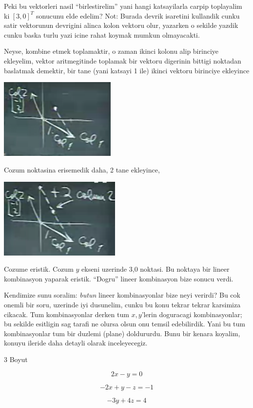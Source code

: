 \documentclass[12pt,fleqn]{article}\usepackage{../common}
\begin{document}
Peki bu vektorleri nasil ``birlestirelim'' yani hangi katsayilarla carpip
toplayalim ki $[3,0]^T$ sonucunu elde edelim? Not: Burada devrik isaretini
kullandik cunku satir vektorunun devrigini alinca kolon vektoru olur,
yazarken o sekilde yazdik cunku baska turlu yazi icine rahat koymak mumkun
olmayacakti. 

Neyse, kombine etmek toplamaktir, o zaman ikinci kolonu alip birinciye
ekleyelim, vektor aritmegitinde toplamak bir vektoru digerinin bittigi
noktadan baslatmak demektir, bir tane (yani katsayi 1 ile) ikinci vektoru
birinciye ekleyince

\includegraphics[height=4cm]{1_04.png}

Cozum noktasina erisemedik daha, 2 tane ekleyince,

\includegraphics[height=4cm]{1_05.png}

Cozume eristik. Cozum $y$ ekseni uzerinde 3,0 noktasi. Bu noktaya bir
lineer kombinasyon yaparak eristik. ``Dogru'' lineer kombinasyon bize
sonucu verdi. 

Kendimize sunu soralim: {\em butun} lineer kombinasyonlar bize neyi
verirdi? Bu cok onemli bir soru, uzerinde iyi dusunelim, cunku bu konu
tekrar tekrar karsimiza cikacak. Tum kombinasyonlar derken tum $x,y$'lerin
doguracagi kombinasyonlar; bu sekilde esitligin sag tarafi ne olursa olsun
onu temsil edebilirdik. Yani bu tum kombinasyonlar tum bir duzlemi (plane)
doldururdu. Bunu bir kenara koyalim, konuyu ileride daha detayli olarak
inceleyecegiz.

3 Boyut

$$  2x - y = 0  $$

$$ -2x + y - z = -1 $$

$$ -3y + 4z = 4 $$
\end{document}
